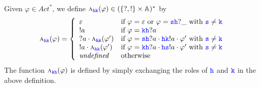 
\begin{definition}
Given $\varphi\in\textit{Act}^*$, we define $\symb{\HH\KK}{\varphi}\in (\Set{?,!}\times\mathbb{A})^* $  by 
$$\symb{\HH\KK}{\varphi} = \left\{\begin{array}{ll}                                             
                                                \varepsilon & \text{if }  \varphi  = \varepsilon  \text{ or } \varphi = \tts\HH?\_ \text{ with } \tts\neq\KK    \\
                                                !a & \text{if }  \varphi = \KK\HH?a \\
                                               ?a\cdot\symb{\HH\KK}{\varphi'} & 
                                                      \text{if } \varphi= \tts\HH?a \cdot \HH\KK!a \cdot \varphi' \text{ with } \tts\neq\KK\\
                                                !a\cdot\symb{\HH\KK}{\varphi'}   & 
                                                         \text{if } \varphi= \KK\HH?a \cdot \HH\tts!a \cdot \varphi'  \text{ with } \tts\neq\KK\\
                                               \textit{undefined}  & \text{otherwise } 
                                      \end{array} \right. 
$$
The function $\symb{\KK\HH}{\varphi}$ is defined by simply exchanging the roles of $\HH$ and $\KK$ in the above definition.
\end{definition}

